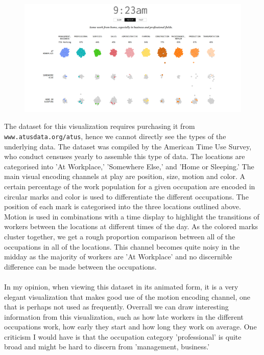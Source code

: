 \documentclass[12pt]{article}
\begin{document}
\begin{figure}[h]
	\centering
	\includegraphics[scale=0.17]{workday}
\end{figure}

The dataset for this visualization requires purchasing it from \texttt{www.atusdata.org/atus}, hence we cannot directly see the types of the underlying data. The dataset was compiled by the American Time Use Survey, who conduct censuses yearly to assemble this type of data. The locations are categorised into 'At Workplace,' 'Somewhere Else,' and 'Home or Sleeping.' The main visual encoding channels at play are position, size, motion and color. A certain percentage of the work population for a given occupation are encoded in circular marks and color is used to differentiate the different occupations. The position of each mark is categorised into the three locations outlined above. Motion is used in combinations with a time display to highlight the transitions of workers between the locations at different times of the day. As the colored marks cluster together, we get a rough proportion comparison between all of the occupations in all of the locations. This channel becomes quite noisy in the midday as the majority of workers are 'At Workplace' and no discernible difference can be made between the occupations. \paragraph{}

In my opinion, when viewing this dataset in its animated form, it is a very elegant visualization that makes good use of the motion encoding channel, one that is perhaps not used as frequently. Overrall we can draw interesting information from this visualization, such as how late workers in the different occupations work, how early they start and how long they work on average. One criticism I would have is that the occupation category 'professional' is quite broad and might be hard to discern from 'management, business.'
\end{document}
